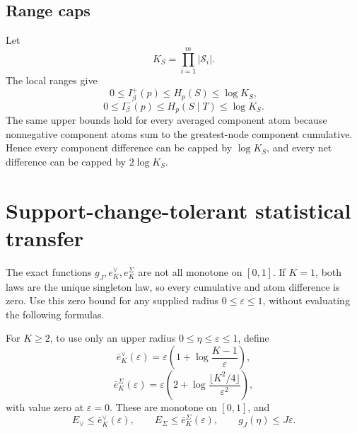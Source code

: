 \documentclass[11pt]{article}
\theoremstyle{definition}
\begin{document}
\subsection{Range caps}

Let
\begin{equation}
  K_S=\prod_{i=1}^{m}|\mathcal S_i|.
\end{equation}
The local ranges give
\begin{equation}
  0\le I_\beta^+(p)\le H_p(S)\le\log K_S,
\end{equation}
\begin{equation}
  0\le I_\beta^-(p)\le H_p(S\mid T)\le\log K_S.
\end{equation}
The same upper bounds hold for every averaged component atom because nonnegative component atoms
sum to the greatest-node component cumulative.  Hence every component difference can be capped
by \(\log K_S\), and every net difference can be capped by \(2\log K_S\).

\section{Support-change-tolerant statistical transfer}

The exact functions \(g_J,e_K^\vee,e_K^\Sigma\) are not all monotone on \([0,1]\).
If \(K=1\), both laws are the unique singleton law, so every cumulative and atom difference is
zero.  Use this zero bound for any supplied radius \(0\le\varepsilon\le1\), without evaluating
the following formulas.

For \(K\ge2\), to use only an upper radius \(0\le\eta\le\varepsilon\le1\), define
\begin{equation}
  \bar e_K^\vee(\varepsilon)
  =
  \varepsilon
  \left(1+\log\frac{K-1}{\varepsilon}\right),
\end{equation}
\begin{equation}
  \bar e_K^\Sigma(\varepsilon)
  =
  \varepsilon
  \left(
    2+\log\frac{\lfloor K^2/4\rfloor}{\varepsilon^2}
  \right),
\end{equation}
with value zero at \(\varepsilon=0\).  These are monotone on \([0,1]\), and
\begin{equation}
  E_\vee\le\bar e_K^\vee(\varepsilon),
  \qquad
  E_\Sigma\le\bar e_K^\Sigma(\varepsilon),
  \qquad
  g_J(\eta)\le J\varepsilon.
\end{equation}
\end{document}
